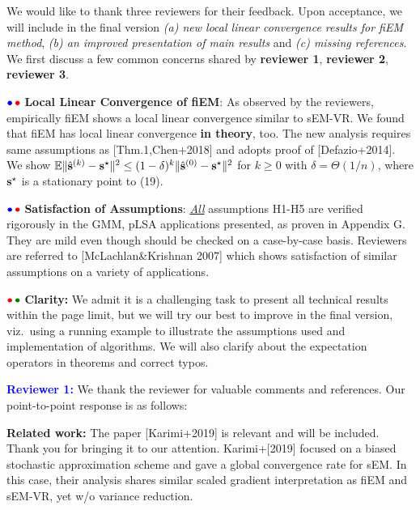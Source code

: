 \documentclass{article}
\begin{document}
We would like to thank three reviewers for their feedback. Upon acceptance, we will include in the final version \emph{{\sf (a)} new local linear convergence results for fiEM method}, \emph{{\sf (b)} an improved presentation of main results} and \emph{{\sf (c)} missing references}. We first discuss a few common concerns shared by \textbf{\color{blue}reviewer 1}, \textbf{\color{red} reviewer 2}, \textbf{\color{green!50!black}reviewer 3}.

${\color{blue}\bullet}\!~{\color{red}\bullet}$ \textbf{Local Linear Convergence of fiEM}: As observed by the reviewers, empirically fiEM shows a local linear convergence similar to sEM-VR. We found that fiEM has local linear convergence \textbf{in theory}, too. The new analysis requires same assumptions as [Thm.1,Chen+2018] and adopts proof of [Defazio+2014]. We show $\mathbb{E} \| \hat{\bf s}^{(k)} - {\bf s}^\star \|^2 \leq (1-\delta)^k \| \hat{\bf s}^{(0)} - {\bf s}^\star\|^2$ for $k \geq 0$ with $\delta = \Theta(1/n)$, where  ${\bf s}^\star$ is a stationary point to (19). %

${\color{blue}\bullet}\!~{\color{red}\bullet}$ \textbf{Satisfaction of Assumptions}:  \underline{\emph{All}} assumptions H1-H5 are verified rigorously in the   GMM, pLSA applications presented, as proven in Appendix G. They are mild even though should be checked on a case-by-case basis. Reviewers are referred to [McLachlan\&Krishnan 2007] which shows satisfaction of similar assumptions on a variety of applications.

${\color{red}\bullet}\!~{\color{green!50!black}\bullet}$ \textbf{Clarity:} We admit it is a challenging task to present all technical results within the page limit, but we will try our best to improve in the final version, viz.~using a running example to illustrate the assumptions used and implementation of algorithms.  
We will also clarify about the expectation operators in theorems and correct typos.

\textbf{\textcolor{blue}{Reviewer 1:}} We thank the reviewer for valuable comments and references. Our point-to-point response is as follows:

\textbf{Related work:} The paper [Karimi+2019] is relevant and will be included. Thank you for bringing it to our attention. Karimi+[2019] focused on a biased stochastic approximation scheme and gave a global convergence rate for sEM. In this case, their analysis shares similar scaled gradient interpretation as fiEM and sEM-VR, yet w/o variance reduction.
\end{document}
